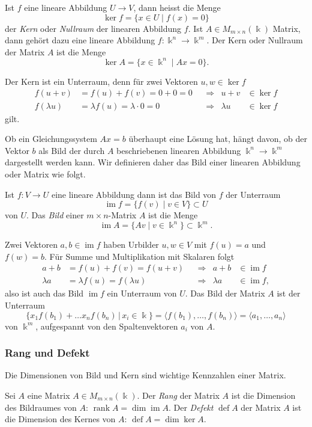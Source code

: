 \begin{definition}
%
Ist $f$ eine lineare Abbildung $U\to V$, dann heisst die Menge
\[
\ker f
=
\{x\in U \mid f(x)=0\}
\]
der {\em Kern} oder {\em Nullraum} der linearen Abbildung $f$.
%
%
Ist $A \in M_{m\times n}(\Bbbk)$ Matrix, dann gehört dazu eine lineare
Abbildung $f\colon\Bbbk^n\to\Bbbk^m$.
Der Kern oder Nullraum der Matrix $A$ ist die Menge
\[
\ker A
=
\{ x\in\Bbbk^n \mid Ax=0\}.
\]
\end{definition}

Der Kern ist ein Unterraum, denn für zwei Vektoren $u,w\in \ker f$
\[
\begin{aligned}
f(u+v)&=f(u) + f(v) = 0+0 = 0 &&\Rightarrow& u+v&\in\ker f\\
f(\lambda u)&=\lambda f(u) = \lambda\cdot 0=0&&\Rightarrow& \lambda u&\in\ker f
\end{aligned}
\]
gilt.

Ob ein Gleichungssystem $Ax=b$ überhaupt eine Lösung hat, hängt davon,
ob der Vektor $b$ als Bild der durch $A$ beschriebenen linearen Abbildung
$\Bbbk^n \to \Bbbk^m$ dargestellt werden kann.
Wir definieren daher das Bild einer linearen Abbildung oder Matrix
wie folgt.

\begin{definition}
Ist $f\colon V\to U$ eine lineare Abbildung dann ist das Bild von $f$
der Unterraum
\[
\operatorname{im}f = \{ f(v)  \mid v\in V\} \subset U
\]
von $U$.
Das {\em Bild} einer $m\times n$-Matrix $A$ ist die Menge
\[
\operatorname{im}A = \{ Av \mid v\in\Bbbk^n\} \subset \Bbbk^m.
\]
\end{definition}
%

Zwei Vektoren $a,b\in\operatorname{im} f$ haben Urbilder $u,w\in V$ mit
$f(u)=a$ und $f(w)=b$.
Für Summe und Multiplikation mit Skalaren folgt
\[
\begin{aligned}
a+b       &= f(u)+f(v)=f(u+v)           && \Rightarrow &       a+b &\in\operatorname{im}f\phantom{,}\\
\lambda a &=\lambda f(u) = f(\lambda u) && \Rightarrow & \lambda a &\in\operatorname{im}f,
\end{aligned}
\]
also ist auch das Bild $\operatorname{im}f$ ein Unterraum von $U$.
Das Bild der Matrix $A$ ist der Unterraum
\[
\{ x_1f(b_1) + \dots x_n f(b_n) \,|\, x_i\in\Bbbk\}
=
\langle f(b_1),\dots,f(b_n)\rangle
=
\langle a_1,\dots,a_n\rangle
\]
von $\Bbbk^m$, aufgespannt von den Spaltenvektoren $a_i$ von $A$.

\subsubsection{Rang und Defekt}
Die Dimensionen von Bild und Kern sind wichtige Kennzahlen einer Matrix.
\begin{definition}
Sei $A$ eine Matrix $A\in M_{m\times n}(\Bbbk)$.
Der {\em Rang} der Matrix $A$ ist die Dimension des Bildraumes von $A$:
$\operatorname{rank}A=\dim\operatorname{im} A$.
%
%
Der {\em Defekt} $\operatorname{def}A$ der Matrix $A$ ist die Dimension
des Kernes von $A$:
$\operatorname{def}A=\dim\ker A$.
%
\end{definition}

